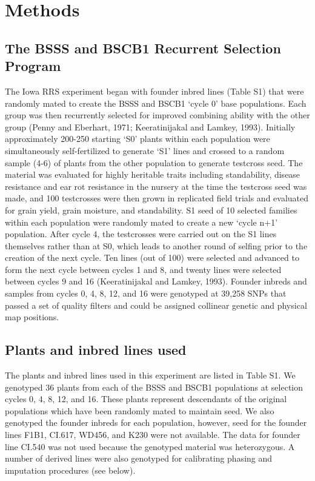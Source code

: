 \section*{Methods}
\subsection*{The BSSS and BSCB1 Recurrent Selection Program}
The Iowa RRS experiment began with founder inbred lines (Table S1) that were randomly mated to create the BSSS and BSCB1 ‘cycle 0’ base populations. 
Each group was then recurrently selected for improved combining ability with the other group (Penny and Eberhart, 1971; Keeratinijakal and Lamkey, 1993). 
Initially approximately 200-250 starting ‘S0’ plants within each population were simultaneously self-fertilized to generate ‘S1’ lines and crossed to a random sample (4-6) of plants from the other population to generate testcross seed. 
The material was evaluated for highly heritable traits including standability, disease resistance and ear rot resistance in the nursery at the time the testcross seed was made, and 100 testcrosses were then grown in replicated field trials and evaluated for grain yield, grain moisture, and standability.  
S1 seed of 10 selected families within each population were randomly mated to create a new ‘cycle n+1’ population. 
After cycle 4, the testcrosses were carried out on the S1 lines themselves rather than at S0, which leads to another round of selfing prior to the creation of the next cycle. Ten lines (out of 100) were selected and advanced to form the next cycle between cycles 1 and 8, and twenty lines were selected between cycles 9 and 16 (Keeratinijakal and Lamkey, 1993). 
Founder inbreds and samples from cycles 0, 4, 8, 12, and 16 were genotyped at 39,258 SNPs that passed a set of quality filters and could be assigned collinear genetic and physical map positions. 

\subsection*{Plants and inbred lines used}
The plants and inbred lines used in this experiment are listed in Table S1. 
We genotyped 36 plants from each of the BSSS and BSCB1 populations at selection cycles 0, 4, 8, 12, and 16. These plants represent descendants of the original populations which have been randomly mated to maintain seed. 
We also genotyped the founder inbreds for each population, however, seed for the founder lines F1B1, CI.617, WD456, and K230 were not available. 
The data for founder line CI.540 was not used because the genotyped material was heterozygous. 
A number of derived lines were also genotyped for calibrating phasing and imputation procedures (see below).

